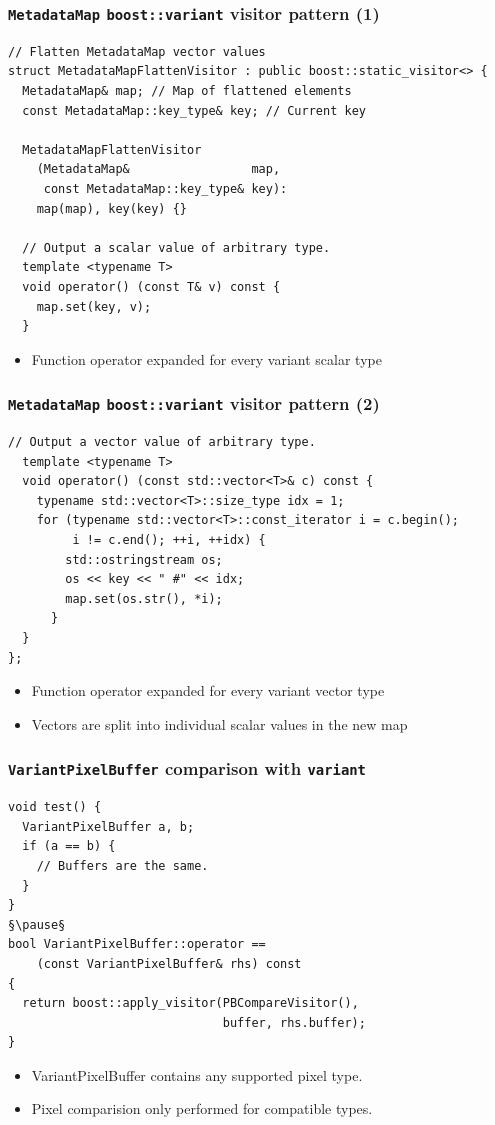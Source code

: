 \documentclass[handout]{beamer}
\begin{document}
\begin{frame}[fragile]
  \frametitle{\texttt{MetadataMap} \texttt{boost::variant} visitor pattern (1)}
    \footnotesize
    \begin{lstlisting}[basicstyle=\scriptsize\ttfamily,frame=tlr]
// Flatten MetadataMap vector values
struct MetadataMapFlattenVisitor : public boost::static_visitor<> {
  MetadataMap& map; // Map of flattened elements
  const MetadataMap::key_type& key; // Current key

  MetadataMapFlattenVisitor
    (MetadataMap&                 map,
     const MetadataMap::key_type& key):
    map(map), key(key) {}

  // Output a scalar value of arbitrary type.
  template <typename T>
  void operator() (const T& v) const {
    map.set(key, v);
  }
\end{lstlisting}
  \begin{itemize}
    \pause
  \item Function operator expanded for every variant scalar type
  \end{itemize}
\end{frame}

\begin{frame}[fragile]
  \frametitle{\texttt{MetadataMap} \texttt{boost::variant} visitor pattern (2)}
    \scriptsize
    \begin{lstlisting}[frame=blr]
  // Output a vector value of arbitrary type.
  template <typename T>
  void operator() (const std::vector<T>& c) const {
    typename std::vector<T>::size_type idx = 1;
    for (typename std::vector<T>::const_iterator i = c.begin();
         i != c.end(); ++i, ++idx) {
        std::ostringstream os;
        os << key << " #" << idx;
        map.set(os.str(), *i);
      }
  }
};
\end{lstlisting}
  \begin{itemize}
    \pause
  \item Function operator expanded for every variant vector type
  \item Vectors are split into individual scalar values in the new map
  \end{itemize}
\end{frame}

\begin{frame}[fragile]
  \frametitle{\texttt{VariantPixelBuffer} comparison with \texttt{variant}}
  \scriptsize
  \begin{lstlisting}
void test() {
  VariantPixelBuffer a, b;
  if (a == b) {
    // Buffers are the same.
  }
}
§\pause§
bool VariantPixelBuffer::operator ==
    (const VariantPixelBuffer& rhs) const
{
  return boost::apply_visitor(PBCompareVisitor(),
                              buffer, rhs.buffer);
}
\end{lstlisting}
  \begin{itemize}
    \pause
  \item VariantPixelBuffer contains any supported pixel type.
  \item Pixel comparision only performed for compatible types.
  \end{itemize}
\end{frame}
\end{document}
